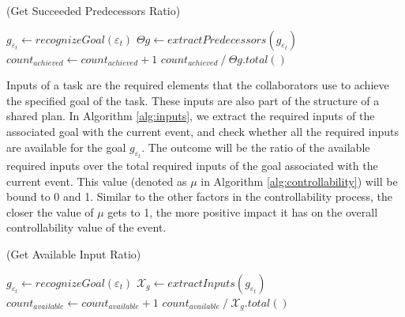 \documentclass[letterpaper]{article}
\begin{document}
\renewcommand\thealgorithm{4\alph{algorithm}}
\setcounter{algorithm}{2}

\begin{algorithm}
	\caption{(Get Succeeded Predecessors Ratio)}
	\label{alg:predecessors}
	\begin{algorithmic}[1]
			\Statex
			\State $\mathit{g}_{\varepsilon_t} \gets
			\textit{recognizeGoal}{(\varepsilon_t)}$
			\Statex
				\State {}
			\EndIf
			\Statex
			\State $\Theta{\mathit{g}} \gets
			\textit{extractPredecessors}{(\mathit{g}_{\varepsilon_t})}$
			\Statex
					\State $count_{achieved} \gets count_{achieved} + 1$
				\EndIf
			\EndFor
			\Statex
			\State \Return
			${count_{achieved} \mathbin{/} {\Theta{\mathit{g}}.total()}}$
		\EndFunction 
	\end{algorithmic}
\end{algorithm}

Inputs of a task are the required elements that the collaborators use to
achieve the specified goal of the task. These inputs are also part of the
structure of a shared plan. In Algorithm \ref{alg:inputs}, we extract the
required inputs of the associated goal with the current event, and check whether
all the required inputs are available for the goal $\mathit{g}_{\varepsilon_t}$.
The outcome will be the ratio of the available required inputs over the total
required inputs of the goal associated with the current event. This value
(denoted as $\mu$ in Algorithm \ref{alg:controllability}) will be bound to 0 and
1. Similar to the other factors in the controllability process, the closer the
value of $\mu$ gets to 1, the more positive impact it has on the overall
controllability value of the event.

\renewcommand\thealgorithm{4\alph{algorithm}}
\setcounter{algorithm}{3}

\begin{algorithm}
	\caption{(Get Available Input Ratio)}
	\label{alg:inputs}
	\begin{algorithmic}[1]
			\Statex
			\State $\mathit{g}_{\varepsilon_t} \gets
			\textit{recognizeGoal}{(\varepsilon_t)}$
			\Statex
				\State {}
			\EndIf
			\Statex
			\State $\mathcal{X}_{\mathit{g}} \gets
			\textit{extractInputs}{(\mathit{g}_{\varepsilon_t})}$
			\Statex
					\State $count_{available} \gets count_{available} + 1$
				\EndIf
			\EndFor
			\Statex
			\State \Return
			${count_{available} \mathbin{/} \mathcal{X}_{\mathit{g}}.total()}$
		\EndFunction 
	\end{algorithmic}
\end{algorithm}
\end{document}
